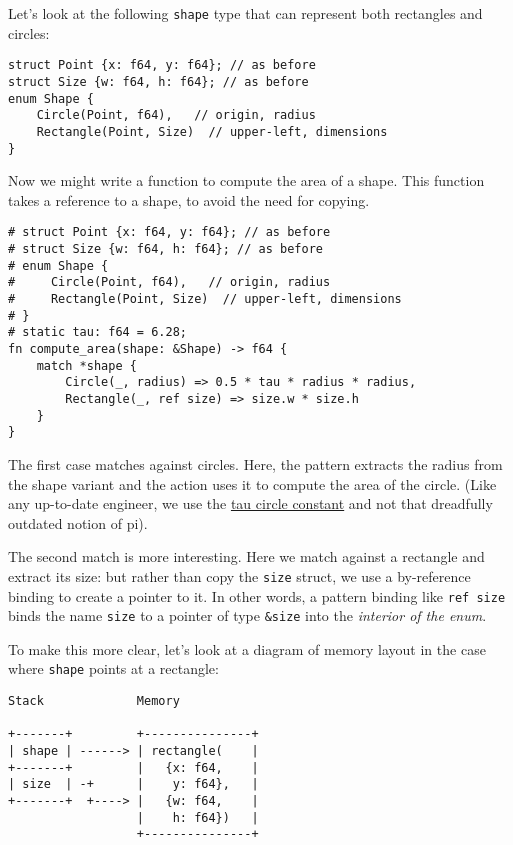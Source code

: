 \documentclass[]{article}
\begin{document}
Let's look at the following \texttt{shape} type that can represent both
rectangles and circles:

\begin{verbatim}
struct Point {x: f64, y: f64}; // as before
struct Size {w: f64, h: f64}; // as before
enum Shape {
    Circle(Point, f64),   // origin, radius
    Rectangle(Point, Size)  // upper-left, dimensions
}
\end{verbatim}

Now we might write a function to compute the area of a shape. This
function takes a reference to a shape, to avoid the need for copying.

\begin{verbatim}
# struct Point {x: f64, y: f64}; // as before
# struct Size {w: f64, h: f64}; // as before
# enum Shape {
#     Circle(Point, f64),   // origin, radius
#     Rectangle(Point, Size)  // upper-left, dimensions
# }
# static tau: f64 = 6.28;
fn compute_area(shape: &Shape) -> f64 {
    match *shape {
        Circle(_, radius) => 0.5 * tau * radius * radius,
        Rectangle(_, ref size) => size.w * size.h
    }
}
\end{verbatim}

The first case matches against circles. Here, the pattern extracts the
radius from the shape variant and the action uses it to compute the area
of the circle. (Like any up-to-date engineer, we use the
\href{http://www.math.utah.edu/~palais/pi.html}{tau circle constant} and
not that dreadfully outdated notion of pi).

The second match is more interesting. Here we match against a rectangle
and extract its size: but rather than copy the \texttt{size} struct, we
use a by-reference binding to create a pointer to it. In other words, a
pattern binding like \texttt{ref size} binds the name \texttt{size} to a
pointer of type \texttt{\&size} into the \emph{interior of the enum}.

To make this more clear, let's look at a diagram of memory layout in the
case where \texttt{shape} points at a rectangle:

\begin{verbatim}
Stack             Memory

+-------+         +---------------+
| shape | ------> | rectangle(    |
+-------+         |   {x: f64,    |
| size  | -+      |    y: f64},   |
+-------+  +----> |   {w: f64,    |
                  |    h: f64})   |
                  +---------------+
\end{verbatim}
\end{document}
